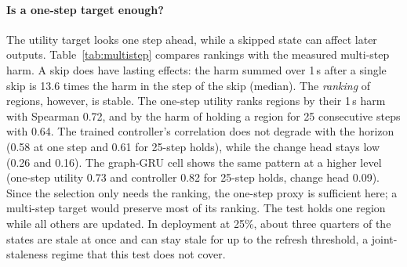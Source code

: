 \paragraph*{Is a one-step target enough?}
\label{sec:multistep}
The utility target looks one step ahead, while a skipped state can affect later outputs. Table~\ref{tab:multistep} compares rankings with the measured multi-step harm. A skip does have lasting effects: the harm summed over 1\,s after a single skip is 13.6 times the harm in the step of the skip (median). The \emph{ranking} of regions, however, is stable. The one-step utility ranks regions by their 1\,s harm with Spearman 0.72, and by the harm of holding a region for 25 consecutive steps with 0.64. The trained controller's correlation does not degrade with the horizon (0.58 at one step and 0.61 for 25-step holds), while the change head stays low (0.26 and 0.16). The graph-GRU cell shows the same pattern at a higher level (one-step utility 0.73 and controller 0.82 for 25-step holds, change head 0.09). Since the selection only needs the ranking, the one-step proxy is sufficient here; a multi-step target would preserve most of its ranking. The test holds one region while all others are updated. In deployment at 25\%, about three quarters of the states are stale at once and can stay stale for up to the refresh threshold, a joint-staleness regime that this test does not cover.

\multisteptable

